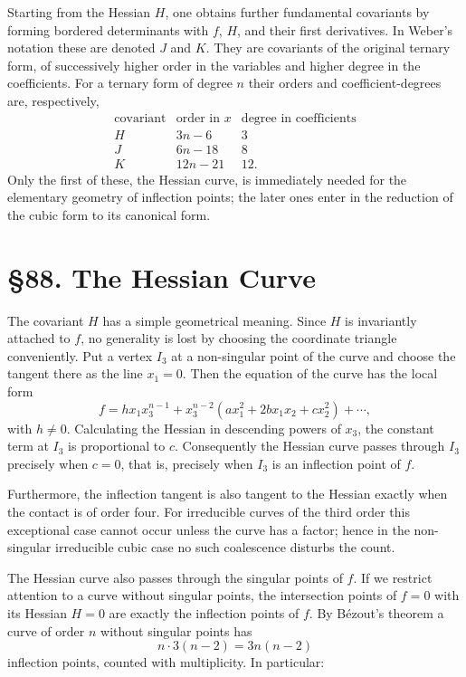 \documentclass[11pt,a4paper]{book}
\newcommand{\webersection}[2]{\clearpage\section*{\S #1. #2}}
\begin{document}
Starting from the Hessian \(H\), one obtains further fundamental covariants by forming bordered determinants with \(f\), \(H\), and their first derivatives.  In Weber's notation these are denoted \(J\) and \(K\).  They are covariants of the original ternary form, of successively higher order in the variables and higher degree in the coefficients.  For a ternary form of degree \(n\) their orders and coefficient-degrees are, respectively,
\[
\begin{array}{c|c|c}
\text{covariant} & \text{order in }x & \text{degree in coefficients}\\
\hline
H & 3n-6 & 3\\
J & 6n-18 & 8\\
K & 12n-21 & 12.
\end{array}
\]
Only the first of these, the Hessian curve, is immediately needed for the elementary geometry of inflection points; the later ones enter in the reduction of the cubic form to its canonical form.

\webersection{88}{The Hessian Curve}

The covariant \(H\) has a simple geometrical meaning.  Since \(H\) is invariantly attached to \(f\), no generality is lost by choosing the coordinate triangle conveniently.  Put a vertex \(I_3\) at a non-singular point of the curve and choose the tangent there as the line \(x_1=0\).  Then the equation of the curve has the local form
\[
f=hx_1x_3^{n-1}
+x_3^{n-2}(ax_1^2+2bx_1x_2+cx_2^2)
+\cdots ,
\]
with \(h\ne0\).  Calculating the Hessian in descending powers of \(x_3\), the constant term at \(I_3\) is proportional to \(c\).  Consequently the Hessian curve passes through \(I_3\) precisely when \(c=0\), that is, precisely when \(I_3\) is an inflection point of \(f\).

Furthermore, the inflection tangent is also tangent to the Hessian exactly when the contact is of order four.  For irreducible curves of the third order this exceptional case cannot occur unless the curve has a factor; hence in the non-singular irreducible cubic case no such coalescence disturbs the count.

The Hessian curve also passes through the singular points of \(f\).  If we restrict attention to a curve without singular points, the intersection points of \(f=0\) with its Hessian \(H=0\) are exactly the inflection points of \(f\).  By Bézout's theorem a curve of order \(n\) without singular points has
\[
n\cdot 3(n-2)=3n(n-2)
\]
inflection points, counted with multiplicity.  In particular:
\end{document}
